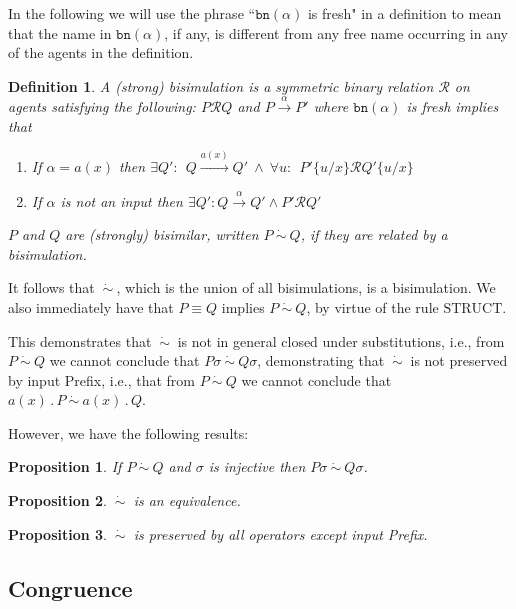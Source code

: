 \documentclass[10pt,a4paper]{article}
\newcommand{\inpp}[2]{#1(#2)}
\newcommand{\prefix}[2]{{#1}\,.\,#2}
\newcommand{\inp}[3]{\prefix{\inpp{#1}{#2}}{#3}}
\newcommand{\bn}{\texttt{bn}}
\newcommand{\tran}[3]{#1 \overset{#2}{\longrightarrow} #3}
\newcommand{\rulname}[1]{\scriptstyle \text{#1}}
\newcommand{\bsim}{\:\dot{\sim}\:}
\newtheorem{theorem}{Proposition}
\newtheorem{definition}{Definition}
\begin{document}
In the following we will use the phrase ``$\bn(\alpha)$ is fresh" in a definition to mean that the name in $\bn(\alpha)$, if any, is different from any free name occurring in any of the agents in the definition.

\begin{definition}
A \textnormal{(strong) bisimulation} is a symmetric binary relation $\mathcal{R}$ on agents satisfying the following: $P \mathcal{R} Q$ and $\tran{P}{\alpha}{P'}$ where \textnormal{$\bn(\alpha)$} is fresh implies that
  \begin{enumerate}
  \item If $\alpha = \inpp{a}{x}$ then $\exists Q' : \:\: \tran{Q}{\inpp{a}{x}}{Q'} \: \wedge \: \forall u : \:\: P'\{u/x\} \mathcal{R} Q'\{u/x\}$
  \item If $\alpha$ is not an input then $\exists Q' : \tran{Q}{\alpha}{Q'} \wedge P' \mathcal{R} Q'$
  \end{enumerate}
$P$ and $Q$ are \textnormal{(strongly) bisimilar}, written $P \bsim Q$, if they are related by a bisimulation.
\end{definition}

It follows that $\bsim$, which is the union of all bisimulations, is a bisimulation. We also immediately have that $P \equiv Q$ implies $P \bsim Q$, by virtue of the rule $\rulname{STRUCT}$.

This demonstrates that $\bsim$ is not in general closed under substitutions, i.e., from $P \bsim Q$ we cannot conclude that $P\sigma \bsim Q\sigma$, demonstrating that $\bsim$ is not preserved by input Prefix, i.e., that from $P \bsim Q$ we cannot conclude that $\inp{a}{x}{P} \bsim \inp{a}{x}{Q}$.

However, we have the following results:

\begin{theorem}
If $P \bsim Q$ and $\sigma$ is injective then $P\sigma \bsim Q\sigma$.
\end{theorem}

\begin{theorem}
$\bsim$ is an equivalence.
\end{theorem}

\begin{theorem}
$\bsim$ is preserved by all operators except input Prefix.
\end{theorem}

\subsection{Congruence}
\end{document}
